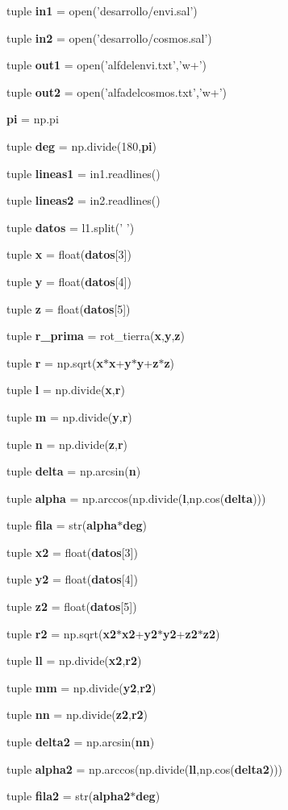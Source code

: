 \begin{DoxyCompactItemize}
\item 
tuple {\bf in1} = open('desarrollo/envi.\-sal')
\item 
tuple {\bf in2} = open('desarrollo/cosmos.\-sal')
\item 
tuple {\bf out1} = open('alfdelenvi.\-txt','w+')
\item 
tuple {\bf out2} = open('alfadelcosmos.\-txt','w+')
\item 
{\bf pi} = np.\-pi
\item 
tuple {\bf deg} = np.\-divide(180,{\bf pi})
\item 
tuple {\bf lineas1} = in1.\-readlines()
\item 
tuple {\bf lineas2} = in2.\-readlines()
\item 
tuple {\bf datos} = l1.\-split(' ')
\item 
tuple {\bf x} = float({\bf datos}[3])
\item 
tuple {\bf y} = float({\bf datos}[4])
\item 
tuple {\bf z} = float({\bf datos}[5])
\item 
tuple {\bf r\-\_\-prima} = rot\-\_\-tierra({\bf x},{\bf y},{\bf z})
\item 
tuple {\bf r} = np.\-sqrt({\bf x}$\ast${\bf x}+{\bf y}$\ast${\bf y}+{\bf z}$\ast${\bf z})
\item 
tuple {\bf l} = np.\-divide({\bf x},{\bf r})
\item 
tuple {\bf m} = np.\-divide({\bf y},{\bf r})
\item 
tuple {\bf n} = np.\-divide({\bf z},{\bf r})
\item 
tuple {\bf delta} = np.\-arcsin({\bf n})
\item 
tuple {\bf alpha} = np.\-arccos(np.\-divide({\bf l},np.\-cos({\bf delta})))
\item 
tuple {\bf fila} = str({\bf alpha}$\ast${\bf deg})
\item 
tuple {\bf x2} = float({\bf datos}[3])
\item 
tuple {\bf y2} = float({\bf datos}[4])
\item 
tuple {\bf z2} = float({\bf datos}[5])
\item 
tuple {\bf r2} = np.\-sqrt({\bf x2}$\ast${\bf x2}+{\bf y2}$\ast${\bf y2}+{\bf z2}$\ast${\bf z2})
\item 
tuple {\bf ll} = np.\-divide({\bf x2},{\bf r2})
\item 
tuple {\bf mm} = np.\-divide({\bf y2},{\bf r2})
\item 
tuple {\bf nn} = np.\-divide({\bf z2},{\bf r2})
\item 
tuple {\bf delta2} = np.\-arcsin({\bf nn})
\item 
tuple {\bf alpha2} = np.\-arccos(np.\-divide({\bf ll},np.\-cos({\bf delta2})))
\item 
tuple {\bf fila2} = str({\bf alpha2}$\ast${\bf deg})
\end{DoxyCompactItemize}


